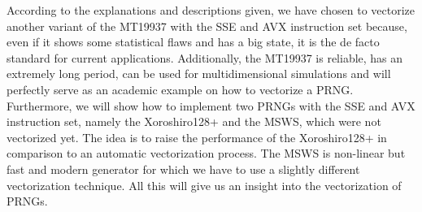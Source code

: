 \documentclass{stdlocal}
\begin{document}
  According to the explanations and descriptions given, we have chosen to vectorize another variant of the MT19937 with the SSE and AVX instruction set because, even if it shows some statistical flaws and has a big state, it is the de facto standard for current applications.
  Additionally, the MT19937 is reliable, has an extremely long period, can be used for multidimensional simulations and will perfectly serve as an academic example on how to vectorize a PRNG.
  Furthermore, we will show how to implement two PRNGs with the SSE and AVX instruction set, namely the Xoroshiro128+ and the MSWS, which were not vectorized yet.
  The idea is to raise the performance of the Xoroshiro128+ in comparison to an automatic vectorization process.
  The MSWS is non-linear but fast and modern generator for which we have to use a slightly different vectorization technique.
  All this will give us an insight into the vectorization of PRNGs.
\end{document}
